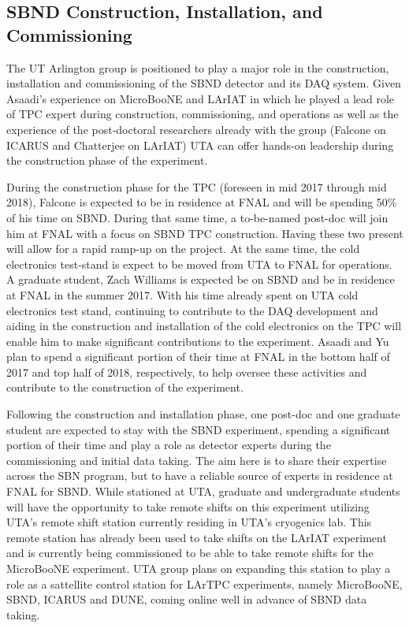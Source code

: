 \subsection{SBND Construction, Installation, and Commissioning}\label{sec:SBNDBulid}
The UT Arlington group is positioned to play a major role in the construction, installation and commissioning of the SBND detector and its DAQ system. Given Asaadi's experience on MicroBooNE and LArIAT in which he played a lead role of TPC expert during construction, commissioning, and operations as well as the experience of the post-doctoral researchers already with the group (Falcone on ICARUS and Chatterjee on LArIAT) UTA can offer hands-on leadership during the construction phase of the experiment.

During the construction phase for the TPC (foreseen in mid 2017 through mid 2018), Falcone is expected to be in residence at FNAL and will be spending 50$\%$ of his time on SBND. During that same time, a to-be-named post-doc will join him at FNAL with a focus on SBND TPC construction. Having these two present will allow for a rapid ramp-up on the project. At the same time, the cold electronics test-stand is expect to be moved from UTA to FNAL for operations. A graduate student, Zach Williams is expected be on SBND and be in residence at FNAL in the summer 2017.  With his time already spent on UTA cold electronics test stand, continuing to contribute to the DAQ development and aiding in the construction and installation of the cold electronics on the TPC will enable him to make significant contributions to the experiment.  Asaadi and Yu plan to spend a significant portion of their time at FNAL in the bottom half of 2017 and top half of 2018, respectively, to help oversee these activities and contribute to the construction of the experiment.

Following the construction and installation phase, one post-doc and one graduate student are expected to stay with the SBND experiment, spending a significant portion of their time and play a role as detector experts during the commissioning and initial data taking. The aim here is to share their expertise across the SBN program, but to have a reliable source of experts in residence at FNAL for SBND.  While stationed at UTA, graduate and undergraduate students will have the opportunity to take remote shifts on this experiment utilizing UTA's remote shift station currently residing in UTA's cryogenics lab. This remote station has already been used to take shifts on the LArIAT experiment and is currently being commissioned to be able to take remote shifts for the MicroBooNE experiment. UTA group plans on expanding this station to play a role as a sattellite control station for LArTPC experiments, namely MicroBooNE, SBND, ICARUS and DUNE, coming online well in advance of SBND data taking.  

